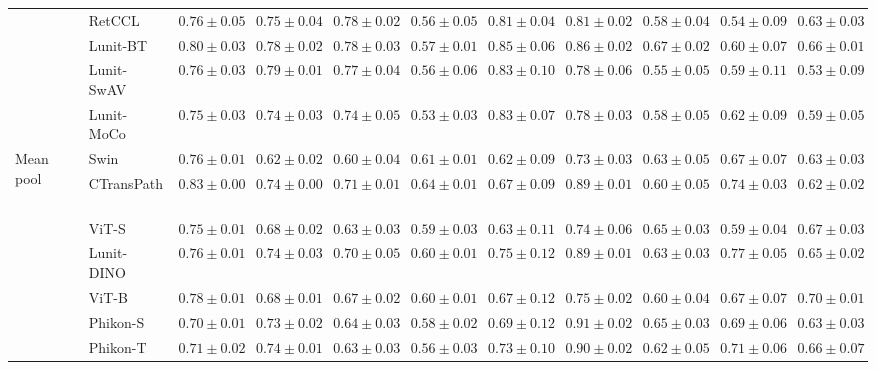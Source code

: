 \begin{tabular}{ll|cccc|c|cccc}
 & RetCCL~\cite{wang2023retccl} & $0.76 \pm 0.05$ & $0.75 \pm 0.04$ & $0.78 \pm 0.02$ & $0.56 \pm 0.05$ & $0.81 \pm 0.04$ & $0.81 \pm 0.02$ & $0.58 \pm 0.04$ & $0.54 \pm 0.09$ & $0.63 \pm 0.03$ \\
 & Lunit-BT~\cite{kang2023benchmarking} & $0.80 \pm 0.03$ & $0.78 \pm 0.02$ & $0.78 \pm 0.03$ & $0.57 \pm 0.01$ & $0.85 \pm 0.06$ & $0.86 \pm 0.02$ & $\mathbf{0.67 \pm 0.02}$ & $0.60 \pm 0.07$ & $0.66 \pm 0.01$ \\
 & Lunit-SwAV~\cite{kang2023benchmarking} & $0.76 \pm 0.03$ & $0.79 \pm 0.01$ & $0.77 \pm 0.04$ & $0.56 \pm 0.06$ & $0.83 \pm 0.10$ & $0.78 \pm 0.06$ & $0.55 \pm 0.05$ & $0.59 \pm 0.11$ & $0.53 \pm 0.09$ \\
 & Lunit-MoCo~\cite{kang2023benchmarking} & $0.75 \pm 0.03$ & $0.74 \pm 0.03$ & $0.74 \pm 0.05$ & $0.53 \pm 0.03$ & $0.83 \pm 0.07$ & $0.78 \pm 0.03$ & $0.58 \pm 0.05$ & $0.62 \pm 0.09$ & $0.59 \pm 0.05$ \\
\cline{1-11}
\multirow[t]{12}{*}{Mean pool} & Swin~\cite{liu2021swin} & $0.76 \pm 0.01$ & $0.62 \pm 0.02$ & $0.60 \pm 0.04$ & $0.61 \pm 0.01$ & $0.62 \pm 0.09$ & $0.73 \pm 0.03$ & $0.63 \pm 0.05$ & $0.67 \pm 0.07$ & $0.63 \pm 0.03$ \\
 & CTransPath~\cite{wang2022transformer} & $\mathbf{0.83 \pm 0.00}$ & $0.74 \pm 0.00$ & $0.71 \pm 0.01$ & $\mathbf{0.64 \pm 0.01}$ & $0.67 \pm 0.09$ & $0.89 \pm 0.01$ & $0.60 \pm 0.05$ & $0.74 \pm 0.03$ & $0.62 \pm 0.02$ \\
 & ViT-S~\cite{kolesnikov2021image} & $0.75 \pm 0.01$ & $0.68 \pm 0.02$ & $0.63 \pm 0.03$ & $0.59 \pm 0.03$ & $0.63 \pm 0.11$ & $0.74 \pm 0.06$ & $0.65 \pm 0.03$ & $0.59 \pm 0.04$ & $0.67 \pm 0.03$ \\
 & Lunit-DINO~\cite{kang2023benchmarking} & $0.76 \pm 0.01$ & $0.74 \pm 0.03$ & $0.70 \pm 0.05$ & $0.60 \pm 0.01$ & $\mathbf{0.75 \pm 0.12}$ & $0.89 \pm 0.01$ & $0.63 \pm 0.03$ & $0.77 \pm 0.05$ & $0.65 \pm 0.02$ \\
 & ViT-B~\cite{kolesnikov2021image} & $0.78 \pm 0.01$ & $0.68 \pm 0.01$ & $0.67 \pm 0.02$ & $0.60 \pm 0.01$ & $0.67 \pm 0.12$ & $0.75 \pm 0.02$ & $0.60 \pm 0.04$ & $0.67 \pm 0.07$ & $\mathbf{0.70 \pm 0.01}$ \\
 & Phikon-S~\cite{filiot2023scaling} & $0.70 \pm 0.01$ & $0.73 \pm 0.02$ & $0.64 \pm 0.03$ & $0.58 \pm 0.02$ & $0.69 \pm 0.12$ & $\mathbf{0.91 \pm 0.02}$ & $\mathbf{0.65 \pm 0.03}$ & $0.69 \pm 0.06$ & $0.63 \pm 0.03$ \\
 & Phikon-T~\cite{filiot2023scaling} & $0.71 \pm 0.02$ & $0.74 \pm 0.01$ & $0.63 \pm 0.03$ & $0.56 \pm 0.03$ & $0.73 \pm 0.10$ & $0.90 \pm 0.02$ & $0.62 \pm 0.05$ & $0.71 \pm 0.06$ & $0.66 \pm 0.07$ \\

\end{tabular}
